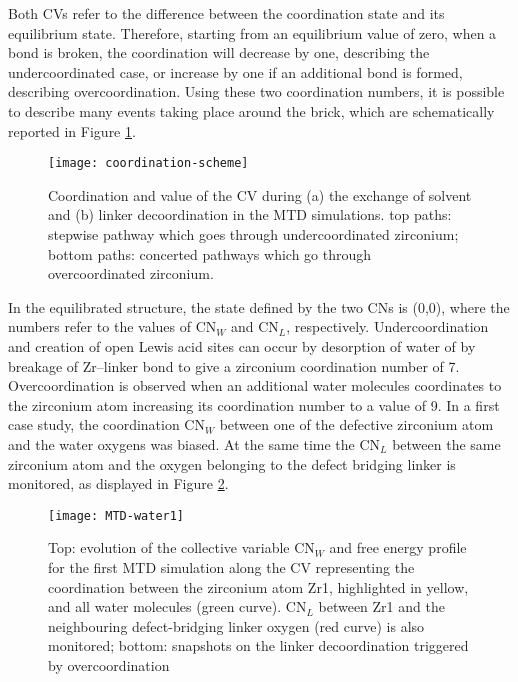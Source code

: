 Both CVs refer to the difference between the coordination state and its equilibrium state. Therefore, starting from an equilibrium value of zero, when a bond is broken, the coordination will decrease by one, describing the undercoordinated case, or increase by one if an additional bond is formed, describing overcoordination. Using these two coordination numbers, it is possible to describe many events taking place around the brick, which are schematically reported in Figure \ref{fig:coordination-scheme}.
\begin{figure}[!htbp]
	\centering
	\texttt{[image: coordination-scheme]}
	\caption{ Coordination and value of the CV during (a) the exchange of solvent and (b) linker decoordination in the MTD simulations. top paths: stepwise pathway which goes through undercoordinated zirconium; bottom paths: concerted pathways which go through overcoordinated zirconium.}
	\label{fig:coordination-scheme}
\end{figure}
\npar
In the equilibrated structure, the state defined by the two CNs is (0,0), where the numbers refer to the values of CN$_W$ and CN$_L$, respectively. Undercoordination and creation of open Lewis acid sites can occur by desorption of water of by breakage of Zr--linker bond to give a zirconium coordination number of 7. Overcoordination is observed when an additional water molecules coordinates to the zirconium atom increasing its coordination number to a value of 9. 
\npar
\npar
In a first case study, the coordination CN$_W$ between one of the defective zirconium atom and the water oxygens was biased. At the same time the CN$_L$ between the same zirconium atom and the oxygen belonging to the defect bridging linker is monitored, as displayed in Figure \ref{fig:MTD-water1}. 
\npar
\begin{figure}[!htbp]
	\centering
	\texttt{[image: MTD-water1]}
	\caption{Top: evolution of the collective variable CN$_W$ and free energy profile for the first MTD simulation along the CV representing the coordination between the zirconium atom Zr1, highlighted in yellow, and all water molecules (green curve). CN$_L$ between Zr1 and the neighbouring defect-bridging linker oxygen (red curve) is also monitored; bottom: snapshots on the linker decoordination triggered by overcoordination}
	\label{fig:MTD-water1}
\end{figure}
